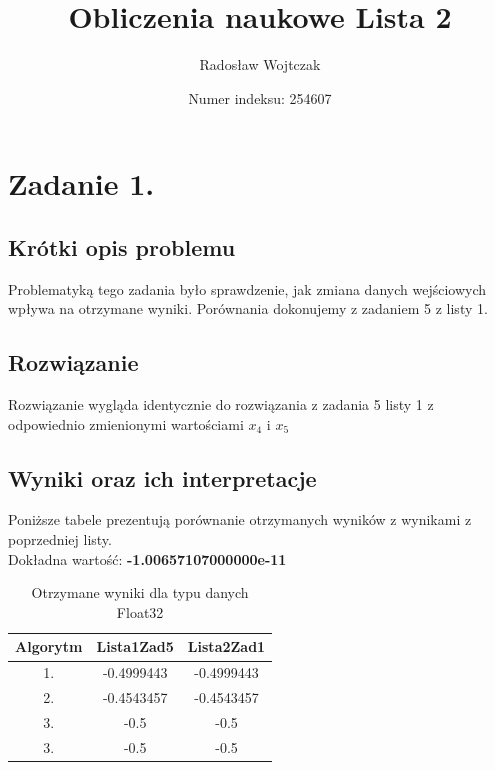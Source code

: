 \documentclass[a4paper,14pt]{report}
\title{Obliczenia naukowe Lista 2}
\author{Radosław Wojtczak}
\date{Numer indeksu: 254607}
\begin{document}
\maketitle
\tableofcontents


\chapter{Zadanie 1.}
  \section{Krótki opis problemu}
    Problematyką tego zadania było sprawdzenie, jak zmiana danych wejściowych wpływa na otrzymane wyniki. Porównania dokonujemy z zadaniem 5 z listy 1.
  \section{Rozwiązanie}
    Rozwiązanie wygląda identycznie do rozwiązania z zadania 5 listy 1 z odpowiednio zmienionymi wartościami $x_{4}$ i $x_{5}$ 
  \section{Wyniki oraz ich interpretacje}
    Poniższe tabele prezentują porównanie otrzymanych wyników z wynikami z poprzedniej listy. \\
    Dokładna wartość: \textbf{-1.00657107000000e-11}
    \begin{table}[h!]
    \centering
    \begin{tabular}{|c | c | c |} 
     \hline
     Algorytm & Lista1Zad5 & Lista2Zad1 \\ [0.5ex] 
     \hline\hline
     1. & -0.4999443 & -0.4999443  \\ 
     2. & -0.4543457 & -0.4543457 \\
     3. & -0.5 & -0.5 \\
     3. & -0.5 & -0.5 \\
     \hline
    \end{tabular}
    \caption{Otrzymane wyniki dla typu danych Float32}
    \label{Zad1Float32}
    \end{table}
\end{document}
